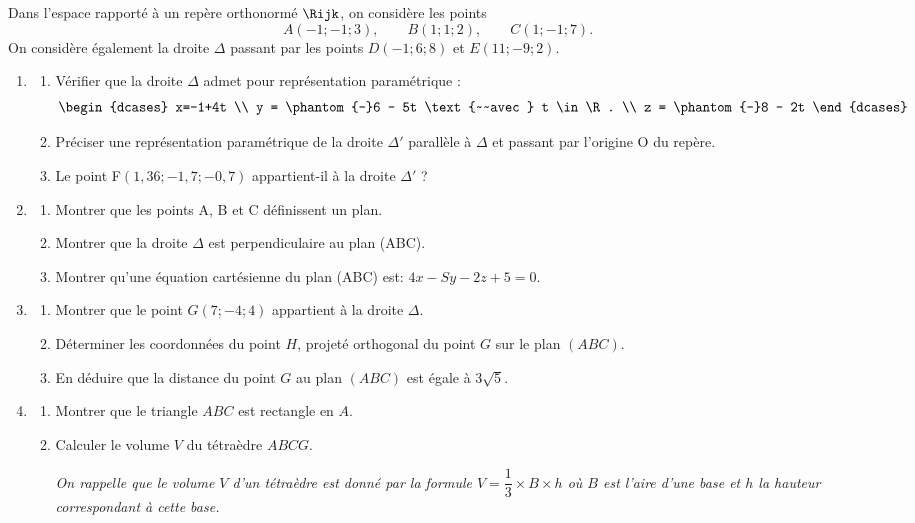 Dans l'espace rapporté à un repère orthonormé $\Rijk$, on considère les points \[A(-1;-1;3),\qquad B(1;1;2),\qquad  C(1;-1;7).\]
%
On considère également la droite $\Delta$ passant par les points $D(-1;6;8)$ et $E(11;- 9;2)$.

\begin{enumerate}
	\item 
	\begin{enumerate}
		\item Vérifier que la droite $\Delta$ admet pour représentation paramétrique : \[ \begin{dcases} x=-1+4t \\ y = \phantom{-}6 - 5t \text{~~avec } t \in \R. \\ z = \phantom{-}8 - 2t \end{dcases}\]
		\item Préciser une représentation paramétrique de la droite $\Delta'$ parallèle à $\Delta$ et passant par l'origine O du repère.
		\item Le point F$(1,36;-1,7;-0,7)$ appartient-il à la droite $\Delta'$ ?
	\end{enumerate}	
	\item
	\begin{enumerate}
		\item Montrer que les points A, B et C définissent un plan.
		\item Montrer que la droite $\Delta$ est perpendiculaire au plan (ABC).
		\item Montrer qu'une équation cartésienne du plan (ABC) est: $4x - Sy - 2z + 5 = 0$.
	\end{enumerate}
	\item
	\begin{enumerate}
		\item Montrer que le point $G(7;-4;4)$ appartient à la droite $\Delta$.
		\item Déterminer les coordonnées du point $H$, projeté orthogonal du point $G$ sur le plan $(ABC)$.
		\item En déduire que la distance du point $G$ au plan $(ABC)$ est égale à $3\sqrt 5$.
	\end{enumerate}
	\item
	\begin{enumerate}
		\item Montrer que le triangle $ABC$ est rectangle en $A$.
		\item Calculer le volume $V$ du tétraèdre $ABCG$.
		
		\emph{On rappelle que le volume $V$ d'un tétraèdre est donné par la formule $V = \dfrac13 \times  B \times h$ où $B$ est l'aire d'une base et $h$ la hauteur correspondant à cette base.}
	\end{enumerate}
\end{enumerate}